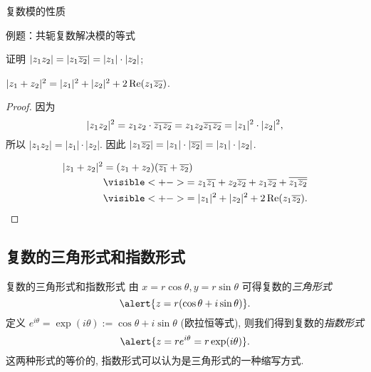 \begin{frame}{复数模的性质}
\begin{center}
\begin{figure}[h]
\begin{subfigure}{0.45\textwidth}
		\end{subfigure}
	\end{figure}
\end{center}
\end{frame}


\begin{frame}{例题：共轭复数解决模的等式}
\onslide<+->
\begin{example}
证明  $|z_1z_2|=|z_1\overline{z_2}|=|z_1|\cdot|z_2|$;

 $|z_1+z_2|^2=|z_1|^2+|z_2|^2+2\operatorname{Re}(z_1\overline{z_2})$.
\end{example}
\onslide<+->
\begin{proof}
 因为
\[|z_1z_2|^2=z_1z_2\cdot\overline{z_1z_2}
=z_1z_2\overline{z_1}\overline{z_2}=|z_1|^2\cdot|z_2|^2,\]
\onslide<+->
所以 $|z_1z_2|=|z_1|\cdot|z_2|$.
\onslide<+->
因此 $|z_1\overline{z_2}|=|z_1|\cdot|\overline{z_2}|=|z_1|\cdot|z_2|$.

\vspace{-0.6\baselineskip}
\begin{align*}
|z_1+z_2|^2&=(z_1+z_2)(\ov{z_1}+\ov{z_2})\\
&\visible<+->{=z_1\ov{z_1}+z_2\ov{z_2}+z_1\ov{z_2}+\ov{z_1\ov{z_2}}}\\
&\visible<+->{=|z_1|^2+|z_2|^2+2\Re(z_1\ov{z_2}).\qedhere}
\end{align*}
\vspace{-1.5\baselineskip}
\end{proof}
\end{frame}


\subsection{复数的三角形式和指数形式}
\begin{frame}{复数的三角形式和指数形式}
\onslide<+->
由 $x=r\cos\theta,y=r\sin\theta$ 可得复数的\emph{三角形式}
\[\alert{z=r(\cos\theta+i\sin\theta)}.\]
\onslide<+->
定义 $e^{i\theta}=\exp(i\theta):=\cos\theta+i\sin\theta$ (欧拉恒等式),
\onslide<+->
则我们得到复数的\emph{指数形式}
\[\alert{z=re^{i\theta}=r\exp(i\theta)}.\]
\onslide<+->
这两种形式的等价的, 指数形式可以认为是三角形式的一种缩写方式.
\end{frame}


